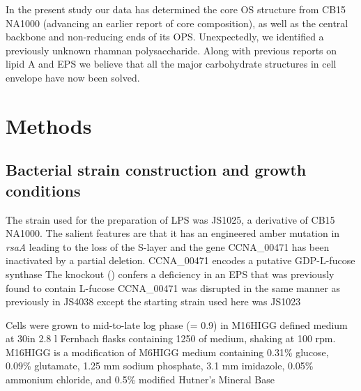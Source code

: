 In the present study our data has determined the core \ac{OS} structure from
\caulobacter CB15 NA1000 (advancing an earlier report of core
composition), as well as the central backbone and
non-reducing ends of its \ac{OPS}. Unexpectedly, we identified a previously
unknown rhamnan polysaccharide. Along with previous reports on lipid
A and \ac{EPS} we believe
that all the major carbohydrate structures in \caulobacter cell envelope have
now been solved.

\section{Methods} %
\label{sec:lps_methods}

	\subsection{Bacterial strain construction and growth conditions} %
	\label{sub:bacterial_strain_construction_and_growth_conditions}

  The strain used for the preparation of \ac{LPS} was JS1025, a derivative of \caulobacter CB15
  NA1000. The salient features are that it has an engineered amber mutation in \textit{rsaA} leading
  to the loss of the \ac{S-layer} and the gene CCNA\_00471 has been inactivated by a partial
  deletion. CCNA\_00471 encodes a putative GDP-L-fucose synthase The
  knockout () confers a deficiency in an \ac{EPS} that was previously found to contain
  L-fucose CCNA\_00471 was disrupted in the same manner as previously in
  JS4038 except the starting strain used here was
  JS1023
		
  Cells were grown to mid-to-late log phase (\od = 0.9) in M16HIGG defined medium at 30\cel in 2.8
  \si{\litre} Fernbach flasks containing 1250 \millilitre of medium, shaking at 100 rpm. M16HIGG is
  a modification of M6HIGG medium containing 0.31\% glucose, 0.09\%
  glutamate, 1.25 \si{\milli\meter} sodium phosphate, 3.1 \si{\milli\meter} imidazole, 0.05\%
  ammonium chloride, and 0.5\% modified Hutner's Mineral Base

